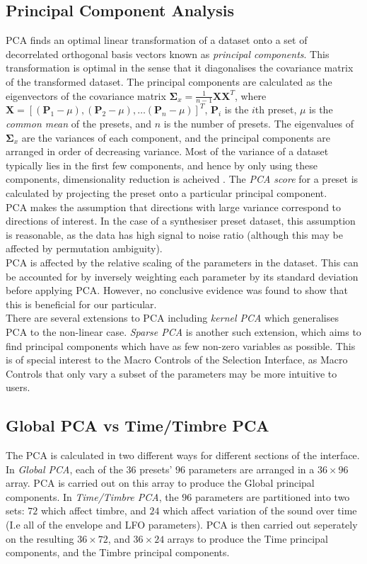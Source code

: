 \documentclass[11pt, oneside]{report}   	%
\renewcommand{\vec}[1]{\mathbf{#1}}
\begin{document}
\subsection{Principal Component Analysis}\label{sec:PCA}
PCA finds an optimal linear transformation of a dataset onto a set of decorrelated orthogonal basis vectors known as \emph{principal components}. This transformation is optimal in the sense that it diagonalises the covariance matrix of the transformed dataset. 
The principal components are calculated as the eigenvectors of the covariance matrix $\vec{\Sigma}_x = \frac{1}{n-1}\vec{X}\vec{X}^T$, where $\vec{X} = [(\vec{P}_1-\mu), (\vec{P}_2-\mu), \dots (\vec{P}_n-\mu)]^T$, $\vec{P}_i$ is the $i$th preset, $\mu$ is the \emph{common mean} of the presets, and $n$ is the number of presets.
The eigenvalues of $\vec{\Sigma}_x$ are the variances of each component, and the principal components are arranged in order of decreasing variance.
Most of the variance of a dataset typically lies in the first few components, and hence by only using these components, dimensionality reduction is acheived \cite{PCA}. The \emph{PCA score} for a preset is calculated by projecting the preset onto a particular principal component.\\
PCA makes the assumption that directions with large variance correspond to directions of interest. In the case of a synthesiser preset dataset, this assumption is reasonable, as the data has high signal to noise ratio (although this may be affected by permutation ambiguity).\\
PCA is affected by the relative scaling of the parameters in the dataset. This can be accounted for by inversely weighting each parameter by its standard deviation before applying PCA. However, no conclusive evidence was found to show that this is beneficial for our particular.\\
There are several extensions to PCA including \emph{kernel PCA} which generalises PCA to the non-linear case. \emph{Sparse PCA} is another such extension, which aims to find principal components which have as few non-zero variables as possible. This is of special interest to the Macro Controls of the Selection Interface, as Macro Controls that only vary a subset of the parameters may be more intuitive to users.
\subsection{Global PCA vs Time/Timbre PCA}\label{sec:GlobalTimeTimbre}
The PCA is calculated in two different ways for different sections of the interface. In \emph{Global PCA}, each of the $36$ presets' $96$ parameters are arranged in a $36 \times 96$ array. PCA is carried out on this array to produce the Global principal components. 
%
In \emph{Time/Timbre PCA}, the $96$ parameters are partitioned into two sets: $72$ which affect timbre, and $24$ which affect variation of the sound over time (I.e all of the envelope and LFO parameters). PCA is then carried out seperately on the resulting  $36 \times 72$, and $36 \times 24$ arrays to produce the Time principal components, and the Timbre principal components. 
\end{document}
